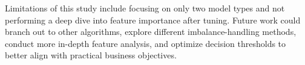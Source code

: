 \documentclass[a4paper,12pt]{article}
\begin{document}
Limitations of this study include focusing on only two model types and not performing a deep dive into feature importance after tuning. Future work could branch out to other algorithms, explore different imbalance-handling methods, conduct more in-depth feature analysis, and optimize decision thresholds to better align with practical business objectives.

\newpage

\printbibliography[heading=bibintoc, title={References}]

\newpage
\end{document}
